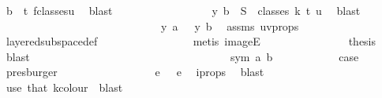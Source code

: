 \begin{isabellebody}
\ {\isacartoucheopen}b\ {\isacharless}{\kern0pt}\ t{\isacartoucheclose}\ f{\isacharunderscore}{\kern0pt}classes{\isacharunderscore}{\kern0pt}u\ \isamarkupfalse%
\ blast\isanewline
\ \ \ \ \ \ \ \ \ \ \ \ \ \ \isamarkupfalse%
\ \isamarkupfalse%
\ {\isachardoublequoteopen}y\ b\ {\isasymin}\ S\ {\isacharbackquote}{\kern0pt}\ classes\ k\ t\ u{\isachardoublequoteclose}\ \isamarkupfalse%
\ blast\isanewline
\ \ \ \ \ \ \ \ \ \ \ \ \isamarkupfalse%
\isanewline
\ \ \ \ \ \ \ \ \ \ \ \ \isamarkupfalse%
\ \isamarkupfalse%
\ {\isachardoublequoteopen}{\isasymchi}\ {\isacharparenleft}{\kern0pt}y\ a{\isacharparenright}{\kern0pt}\ {\isacharequal}{\kern0pt}\ {\isasymchi}\ {\isacharparenleft}{\kern0pt}y\ b{\isacharparenright}{\kern0pt}{\isachardoublequoteclose}\ \isamarkupfalse%
\ assms{\isacharparenleft}{\kern0pt}{}{\isacharparenright}{\kern0pt}\ uv{\isacharunderscore}{\kern0pt}props\ \isamarkupfalse%
\ layered{\isacharunderscore}{\kern0pt}subspace{\isacharunderscore}{\kern0pt}def\ \isanewline
\ \ \ \ \ \ \ \ \ \ \ \ \ \ \isamarkupfalse%
\ {\isacharparenleft}{\kern0pt}metis\ imageE{\isacharparenright}{\kern0pt}\isanewline
\ \ \ \ \ \ \ \ \ \ \ \ \isamarkupfalse%
\ \isamarkupfalse%
\ {\isacharquery}{\kern0pt}thesis\ \isamarkupfalse%
\ blast\isanewline
\ \ \ \ \ \ \ \ \ \ \isamarkupfalse%
\isanewline
\ \ \ \ \ \ \ \ \isamarkupfalse%
\isanewline
\ \ \ \ \ \ \isamarkupfalse%
\isanewline
\ \ \ \ \ \ \ \ \isamarkupfalse%
\ {\isacharparenleft}{\kern0pt}sym\ a\ b{\isacharparenright}{\kern0pt}\isanewline
\ \ \ \ \ \ \ \ \isamarkupfalse%
\ \isamarkupfalse%
\ {\isacharquery}{\kern0pt}case\ \isamarkupfalse%
\ presburger\isanewline
\ \ \ \ \ \ \isamarkupfalse%
\isanewline
\ \ \ \ \ \ \isamarkupfalse%
\ \isamarkupfalse%
\ {\isachardoublequoteopen}{\isasymchi}\ e{}\ {\isacharequal}{\kern0pt}\ {\isasymchi}\ e{}{\isachardoublequoteclose}\ \isamarkupfalse%
\ i{\isacharunderscore}{\kern0pt}props{\isacharparenleft}{\kern0pt}{}{\isacharcomma}{\kern0pt}{}{\isacharparenright}{\kern0pt}\ \isamarkupfalse%
\ blast\isanewline
\ \ \ \ \isamarkupfalse%
\ {\isacharparenleft}{\kern0pt}use\ that{\isacharparenleft}{\kern0pt}{}{\isacharparenright}{\kern0pt}\ k{\isacharunderscore}{\kern0pt}colour\ \ blast{\isacharparenright}{\kern0pt}\isanewline

\end{isabellebody}
